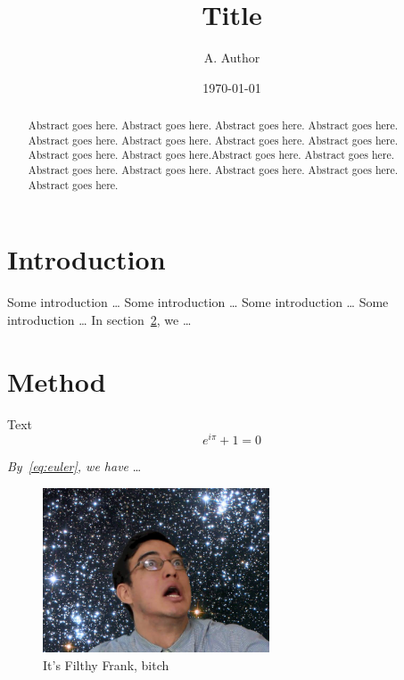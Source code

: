 \documentclass{article}
\title{Title}
\author{A. Author}
\date{\today} %
\begin{document}
\maketitle

\begin{abstract}
Abstract goes here. Abstract goes here. Abstract goes here. Abstract goes here. Abstract goes here. Abstract goes here. Abstract goes here. Abstract goes here. Abstract goes here. Abstract goes here.Abstract goes here. Abstract goes here. Abstract goes here. Abstract goes here. Abstract goes here. Abstract goes here. Abstract goes here.
\end{abstract}

\section{Introduction} %
\label{sec:intro}
Some introduction \ldots
Some introduction \ldots
Some introduction \ldots
Some introduction \ldots
In section~\ref{sec:method}, we \ldots   %
\section{Method}
\label{sec:method}
Text
\begin{equation}
\label{eq:euler}
e^{i\pi} + 1 = 0
\end{equation}

\emph{By~\eqref{eq:euler}, we have} \ldots %
\begin{figure}[h]%
\centering
\includegraphics[width=0.6\textwidth]{frank}\caption{It's Filthy Frank, bitch\label{fig:1}}
\end{figure}
\end{document}
